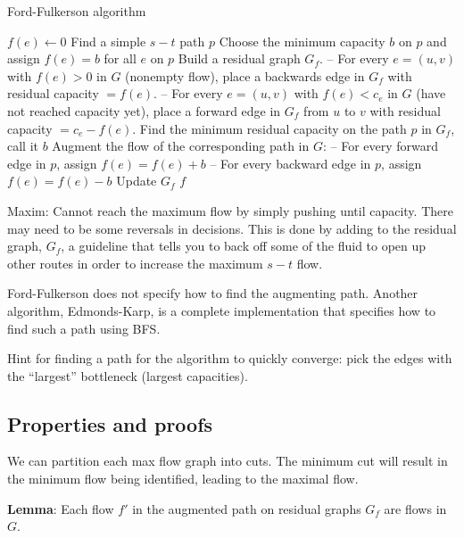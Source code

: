 \documentclass{article}
\begin{document}
\begin{algorithm}
\caption{Ford-Fulkerson algorithm}\label{fordFulkerson}
\begin{algorithmic}[1]
    \State $f(e) \gets 0$
\EndFor
\State Find a simple $s-t$ path $p$
\State Choose the minimum capacity $b$ on $p$ and assign $f(e) = b$ for all $e$ on $p$
\State Build a residual graph $G_f$.
\State -- For every $e = (u, v)$ with $f(e) > 0$ in $G$ (nonempty flow), place a backwards edge in $G_f$ with residual capacity $= f(e)$.
\State -- For every $e = (u, v)$ with $f(e) < c_e$ in $G$ (have not reached capacity yet), place a forward edge in $G_f$ from $u$ to $v$ with residual capacity $= c_e - f(e)$.
    \State Find the minimum residual capacity on the path $p$ in $G_f$, call it $b$
    \State Augment the flow of the corresponding path in $G$:
    \State -- For every forward edge in $p$, assign $f(e) = f(e) + b$
    \State -- For every backward edge in $p$, assign $f(e) = f(e) - b$
    \State Update $G_f$
\EndWhile
\State \Return $f$
\EndProcedure
\end{algorithmic}
\end{algorithm}

Maxim: Cannot reach the maximum flow by simply pushing until capacity. There may need to be some reversals in decisions. This is done by adding to the residual graph, $G_f$, a guideline that tells you to back off some of the fluid to open up other routes in order to increase the maximum $s-t$ flow.

Ford-Fulkerson does not specify how to find the augmenting path. Another algorithm, Edmonds-Karp, is a complete implementation that specifies how to find such a path using BFS.

Hint for finding a path for the algorithm to quickly converge: pick the edges with the ``largest'' bottleneck (largest capacities).

\subsection{Properties and proofs}

We can partition each max flow graph into cuts. The minimum cut will result in the minimum flow being identified, leading to the maximal flow.

\textbf{Lemma}: Each flow $f'$ in the augmented path on residual graphs $G_f$ are flows in $G$.
\end{document}
